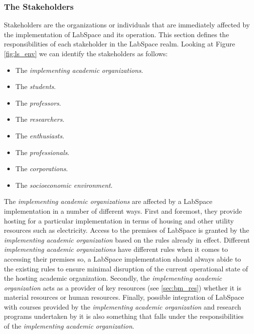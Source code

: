 \documentclass[a4paper, 11pt]{article}
\begin{document}
\subsubsection{The Stakeholders}

Stakeholders are the organizations or individuals that are immediately affected by the implementation of LabSpace and its operation. This section defines the responsibilities of each stakeholder in the LabSpace realm. Looking at Figure \ref{fig:ls_env} we can identify the stakeholders as follows:

\begin{itemize}[noitemsep]
    \item The \textit{implementing academic organizations}.
    \item The \textit{students}.
    \item The \textit{professors}.
    \item The \textit{researchers}.
    \item The \textit{enthusiasts}.
    \item The \textit{professionals}.
    \item The \textit{corporations}.
    \item The \textit{socioeconomic environment}.
\end{itemize}

The \textit{implementing academic organizations} are affected by a LabSpace implementation in a number of different ways. First and foremost, they provide hosting for a particular implementation in terms of housing and other utility resources such as electricity. Access to the premises of LabSpace is granted by the \textit{implementing academic organization} based on the rules already in effect. Different \textit{implementing academic organizations} have different rules when it comes to accessing their premises so, a LabSpace implementation should always abide to the existing rules to ensure minimal disruption of the current operational state of the hosting academic organization. Secondly, the \textit{implementing academic organization} acts as a provider of key resources (see \ref{sec:bm_res}) whether it is material resources or human resources. Finally, possible integration of LabSpace with courses provided by the \textit{implementing academic organization} and research programs undertaken by it is also something that falls under the responsibilities of the \textit{implementing academic organization}.
\end{document}

